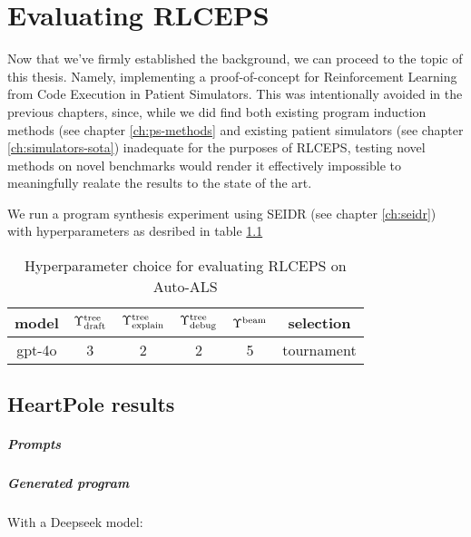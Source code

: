 \chapter{Evaluating RLCEPS}
\label{ch:rlceps-eval}

Now that we've firmly established the background, we can proceed to the topic of this thesis. 
Namely, implementing a proof-of-concept for Reinforcement Learning from Code Execution in Patient Simulators.
This was intentionally avoided in the previous chapters, since, while we did find both existing program induction methods (see chapter \ref{ch:ps-methods} and existing patient simulators (see chapter \ref{ch:simulators-sota}) inadequate for the purposes of RLCEPS, testing novel methods on novel benchmarks would render it effectively impossible to meaningfully realate the results to the state of the art.


We run a program synthesis experiment using SEIDR (see chapter \ref{ch:seidr}) with hyperparameters as desribed in table \ref{tab:rlceps-auto-als}

\begin{table}
    \centering
    \begin{tabular}{|c|c|c|c|c|c|}
        model & $\Upsilon^\text{tree}_\text{draft}$ & $\Upsilon^\text{tree}_\text{explain}$ & $\Upsilon^\text{tree}_\text{debug}$ & $\Upsilon^\text{beam}$ & selection \\
        \midrule
        gpt-4o & 3 & 2 & 2 & 5 & tournament
    \end{tabular}
    \caption{Hyperparameter choice for evaluating RLCEPS on Auto-ALS}
    \label{tab:rlceps-auto-als}
\end{table}

\newpage
\section{HeartPole results}

\paragraph{Prompts}

\paragraph{Generated program}

With a Deepseek model:



